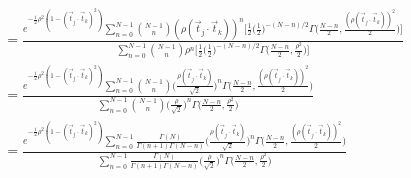 \documentclass[12pt]{article}
\newcommand{\ptjtk}{\rho(\vec{t}_j\cdot\vec{t}_k)}
\begin{document}
        \begin{align}
        &= \frac{ e^{-\frac{1}{2}\rho^2(1-(\vec{t}_j\cdot\vec{t}_k)^2)}  \sum_{n=0}^{N-1} \binom{N-1}{n} (\ptjtk)^{n} 
          \Big[
            \frac{1}{2}\Big(\frac{1}{2}\Big)^{-(N-n)/2}\Gamma\Big(\frac{N-n}{2},\frac{(\ptjtk)^2}{2}\Big)
          \Big] }
          { \sum_{n=0}^{N-1} \binom{N-1}{n} \rho^{n} 
          \Big[
            \frac{1}{2}\Big(\frac{1}{2}\Big)^{-(N-n)/2}\Gamma\Big(\frac{N-n}{2},\frac{\rho^2}{2}\Big)
          \Big] } \\
        &= \frac{ e^{-\frac{1}{2}\rho^2(1-(\vec{t}_j\cdot\vec{t}_k)^2)}  \sum_{n=0}^{N-1} \binom{N-1}{n}
            \Big(\frac{\ptjtk}{\sqrt{2}}\Big)^{n}\Gamma\Big(\frac{N-n}{2},\frac{(\ptjtk)^2}{2}\Big) }
          { \sum_{n=0}^{N-1} \binom{N-1}{n} 
            \Big(\frac{\rho}{\sqrt{2}}\Big)^{n}\Gamma\Big(\frac{N-n}{2},\frac{\rho^2}{2}\Big) } \\
        &= \frac{ e^{-\frac{1}{2}\rho^2(1-(\vec{t}_j\cdot\vec{t}_k)^2)}  \sum_{n=0}^{N-1} \frac{\Gamma(N)}{\Gamma(n+1)\Gamma(N-n)}
            \Big(\frac{\ptjtk}{\sqrt{2}}\Big)^{n}\Gamma\Big(\frac{N-n}{2},\frac{(\ptjtk)^2}{2}\Big) }
          { \sum_{n=0}^{N-1} \frac{\Gamma(N)}{\Gamma(n+1)\Gamma(N-n)} 
            \Big(\frac{\rho}{\sqrt{2}}\Big)^{n}\Gamma\Big(\frac{N-n}{2},\frac{\rho^2}{2}\Big) } \\
        \end{align}

\end{document}
